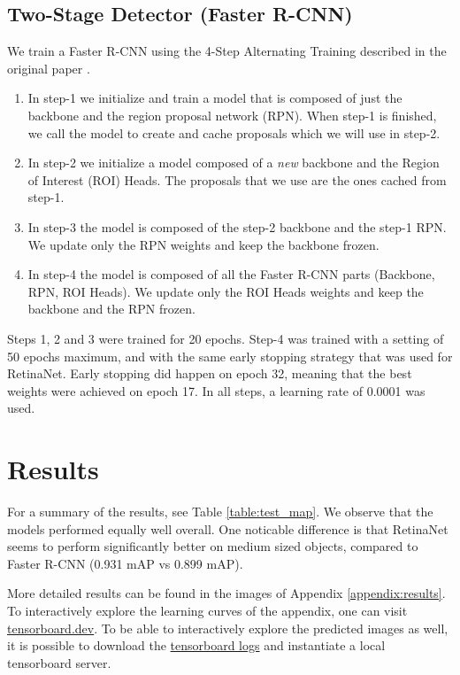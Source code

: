 \documentclass{article}
\begin{document}
\subsection{Two-Stage Detector (Faster R-CNN)}

We train a Faster R-CNN using the 4-Step Alternating Training described in the original paper \cite{fasterrcnn}.

\begin{enumerate}
    \item In step-1 we initialize and train a model that is composed of just the backbone and the region proposal network (RPN). When step-1 is finished, we call the model to create and cache proposals which we will use in step-2.
    \item In step-2 we initialize a model composed of a \emph{new} backbone and the Region of Interest (ROI) Heads. The proposals that we use are the ones cached from step-1.
    \item In step-3 the model is composed of the step-2 backbone and the step-1 RPN. We update only the RPN weights and keep the backbone frozen.
    \item In step-4 the model is composed of all the Faster R-CNN parts (Backbone, RPN, ROI Heads). We update only the ROI Heads weights and keep the backbone and the RPN frozen.
\end{enumerate}

Steps 1, 2 and 3 were trained for 20 epochs. Step-4 was trained with a setting of 50 epochs maximum, and with the same early stopping strategy that was used for RetinaNet. Early stopping did happen on epoch 32, meaning that the best weights were achieved on epoch 17. In all steps, a learning rate of 0.0001 was used.

\section{Results}
For a summary of the results, see Table \ref{table:test_map}. We observe that the models performed equally well overall. One noticable difference is that RetinaNet seems to perform significantly better on medium sized objects, compared to Faster R-CNN (0.931 mAP vs 0.899 mAP).

More detailed results can be found in the images of Appendix \ref{appendix:results}. To interactively explore the learning curves of the appendix, one can visit \href{https://tensorboard.dev/experiment/ErXpnafeS6aX9Fleh9lCZQ/}{tensorboard.dev}. To be able to interactively explore the predicted images as well, it is possible to download the \href{https://ntuagr-my.sharepoint.com/:u:/g/personal/konstantinospapadakis_ntua_gr/EdNjt6ZTrDlPtkvl6aJubhsB8nTLo-kJOdELaH411BjGmg?e=64G3z5}{tensorboard logs} and instantiate a local tensorboard server.
\end{document}
